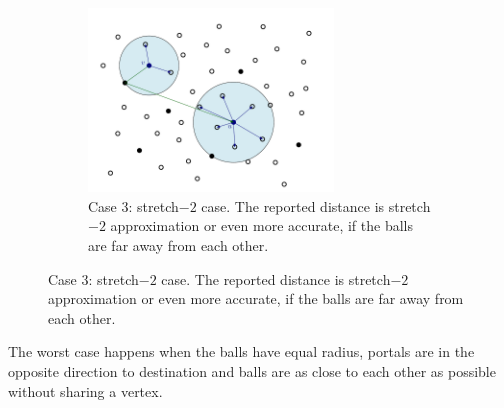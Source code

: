 \documentclass[shortabstract, lic, english]{iithesis}
\theoremstyle{definition} \newtheorem{definition}{Definition}[chapter]
\theoremstyle{plain} \newtheorem{remark}[definition]{Observation}
\theoremstyle{plain} \newtheorem{theorem}[definition]{Theorem}
\theoremstyle{plain} \newtheorem{lemma}[definition]{Lemma}
\theoremstyle{plain} \newtheorem{conjecture}[definition]{Conjecture}
\begin{document}
\begin{figure}[H]
\begin{subfigure}[H]{0.465\textwidth}
        \centering
        \includegraphics[width=6.5cm]{images/case_3}
        \caption{Case $3$: stretch$-2$ case. The reported distance is stretch$-2$ approximation or even more accurate, if the balls are far away from each other. }
    \end{subfigure}
\end{figure}

The worst case happens when the balls have equal radius, portals are in the opposite direction to destination and balls are as close to each other as possible without sharing a vertex.
\end{document}
